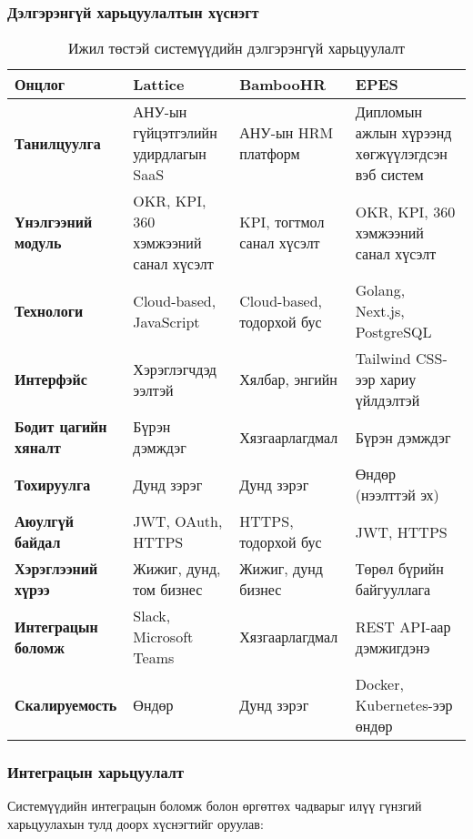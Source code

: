 \subsubsection{Дэлгэрэнгүй харьцуулалтын хүснэгт}
\begin{table}[H]
\centering
\small
\begin{tabular}{|>{\raggedright\arraybackslash}p{3cm}|>{\raggedright\arraybackslash}p{4cm}|>{\raggedright\arraybackslash}p{4cm}|>{\raggedright\arraybackslash}p{4cm}|}
\hline
\textbf{Онцлог} & \textbf{Lattice} & \textbf{BambooHR} & \textbf{EPES} \\
\hline
\textbf{Танилцуулга} & АНУ-ын гүйцэтгэлийн удирдлагын SaaS & АНУ-ын HRM платформ & Дипломын ажлын хүрээнд хөгжүүлэгдсэн вэб систем \\
\hline
\textbf{Үнэлгээний модуль} & OKR, KPI, 360 хэмжээний санал хүсэлт & KPI, тогтмол санал хүсэлт & OKR, KPI, 360 хэмжээний санал хүсэлт \\
\hline
\textbf{Технологи} & Cloud-based, JavaScript & Cloud-based, тодорхой бус & Golang, Next.js, PostgreSQL \\
\hline
\textbf{Интерфэйс} & Хэрэглэгчдэд ээлтэй & Хялбар, энгийн & Tailwind CSS-ээр хариу үйлдэлтэй \\
\hline
\textbf{Бодит цагийн хяналт} & Бүрэн дэмждэг & Хязгаарлагдмал & Бүрэн дэмждэг \\
\hline
\textbf{Тохируулга} & Дунд зэрэг & Дунд зэрэг & Өндөр (нээлттэй эх) \\
\hline
\textbf{Аюулгүй байдал} & JWT, OAuth, HTTPS & HTTPS, тодорхой бус & JWT, HTTPS \\
\hline
\textbf{Хэрэглээний хүрээ} & Жижиг, дунд, том бизнес & Жижиг, дунд бизнес & Төрөл бүрийн байгууллага \\
\hline
\textbf{Интеграцын боломж} & Slack, Microsoft Teams & Хязгаарлагдмал & REST API-аар дэмжигдэнэ \\
\hline
\textbf{Скалируемость} & Өндөр & Дунд зэрэг & Docker, Kubernetes-ээр өндөр \\
\hline
\end{tabular}
\caption{Ижил төстэй системүүдийн дэлгэрэнгүй харьцуулалт}
\label{tab:detailed_comparison}
\end{table}

\subsubsection{Интеграцын харьцуулалт}
Системүүдийн интеграцын боломж болон өргөтгөх чадварыг илүү гүнзгий харьцуулахын тулд доорх хүснэгтийг оруулав:

